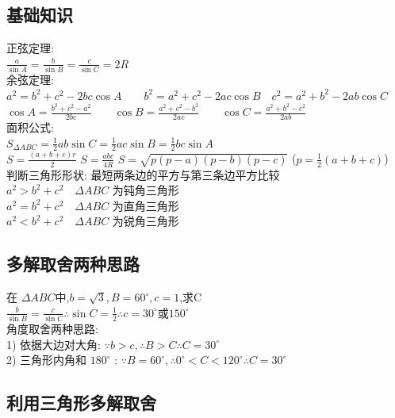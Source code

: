\documentclass[hyperref, UTF8,11pt,a4paper]{ctexart} %
\begin{document}
\subsection{基础知识}
{\color{blue} 正弦定理: } \\ $\frac{a}{\sin A}=\frac{b}{\sin B}=\frac{c}{\sin C}=2 R$ \\
{\color{blue}余弦定理: }\\ $a^{2}=b^{2}+c^{2}-2 b c \cos A \qquad b^{2}=a^{2}+c^{2}-2 a c \cos B \quad c^{2}=a^{2}+b^{2}-2 a b \cos C$ \\
\qquad \qquad $\cos A=\frac{b^{2}+c^{2}-a^{2}}{2 b c} \qquad \cos B=\frac{a^{2}+c^{2}-b^{2}}{2 a c} \qquad \cos C=\frac{a^{2}+b^{2}-c^{2}}{2 a b}$ \\
{\color{blue}面积公式:} \\
$S_{\Delta A B C}=\frac{1}{2} a b \sin C=\frac{1}{2} a c \sin B=\frac{1}{2} b c \sin A$ \\
$S=\frac{(a+b+c) r}{2}$ \qquad
$S=\frac{abc}{4R}$ \qquad $S=\sqrt{p(p-a)(p-b)(p-c)}$ \qquad ($p=\frac{1}{2}(a+b+c)$) \\
{\color{blue}判断三角形形状:}
最短两条边的平方与第三条边平方比较 \\
$a^{2}>b^{2}+c^{2} \quad \Delta A B C$ 为钝角三角形 \\
$a^{2}=b^{2}+c^{2} \quad \Delta A B C$ 为直角三角形 \\
$a^{2}<b^{2}+c^{2} \quad \Delta A B C$ 为锐角三角形 \\
\subsection{多解取舍两种思路}
{\color{red} 在 $\Delta A B C$中,$b=\sqrt{3}, B=60^{\circ}, c=1$,求C } \\
$ \frac{b}{\sin B}=\frac{c}{\sin C} \therefore \sin C=\frac{1}{2} \therefore c=30^{\circ}$或$150^{\circ}$ \\
{\color{blue} 角度取舍两种思路: }\\
1) 依据大边对大角:  \quad
$\because b>c,  \therefore B>C \therefore C=30^{\circ}$ \\
2) 三角形内角和 $180^{\circ}$ : \quad
$ \because   B=60^{\circ}, \therefore 0^{\circ}<C<120^{\circ}  \therefore C=30^{\circ}$ \\
\subsection{利用三角形多解取舍}
\end{document}
